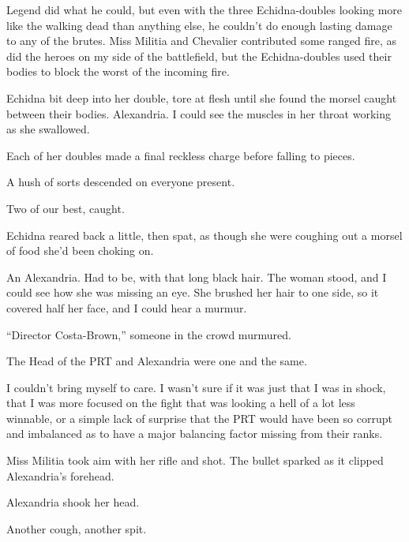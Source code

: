 Legend did what he could, but even with the three Echidna-doubles looking more like the walking dead than anything else, he couldn't do enough lasting damage to any of the brutes.  Miss Militia and Chevalier contributed some ranged fire, as did the heroes on my side of the battlefield, but the Echidna-doubles used their bodies to block the worst of the incoming fire.



Echidna bit deep into her double, tore at flesh until she found the morsel caught between their bodies.  Alexandria.  I could see the muscles in her throat working as she swallowed.



Each of her doubles made a final reckless charge before falling to pieces.



A hush of sorts descended on everyone present.



Two of our best, caught.



Echidna reared back a little, then spat, as though she were coughing out a morsel of food she'd been choking on.



An Alexandria.  Had to be, with that long black hair.  The woman stood, and I could see how she was missing an eye.  She brushed her hair to one side, so it covered half her face, and I could hear a murmur.



``Director Costa-Brown,'' someone in the crowd murmured.



The Head of the PRT and Alexandria were one and the same.



I couldn't bring myself to care.  I wasn't sure if it was just that I was in shock, that I was more focused on the fight that was looking a hell of a lot less winnable, or a simple lack of surprise that the PRT would have been so corrupt and imbalanced as to have a major balancing factor missing from their ranks.



Miss Militia took aim with her rifle and shot.  The bullet sparked as it clipped Alexandria's forehead.



Alexandria shook her head.



Another cough, another spit.



